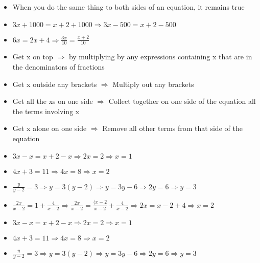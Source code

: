 \begin{frame}
\begin{itemize}
\item When you do the same thing to both sides of an equation, it remains true
\item $3x + 1000 = x + 2 + 1000 \Rightarrow 3x - 500  =  x + 2 - 500$
\vspace*{.35cm}
\item $6x = 2x  + 4 \Rightarrow \frac{3x}{10}  =  \frac{x+2}{10}$
\end{itemize}
\end{frame}
\begin{frame}
\begin{itemize}
\item Get x on top $\Rightarrow$ by multiplying by any expressions containing x that are in the denominators of fractions
\item Get x outside any brackets $\Rightarrow$ Multiply out any brackets
\item Get all the xs on one side $\Rightarrow$ Collect together on one side of the equation all the terms involving x
\item Get x alone on one side $\Rightarrow$ Remove all other terms from that side of the equation
\end{itemize}
\end{frame}
\begin{frame}
\begin{itemize}
\item $3x - x = x + 2 - x \Rightarrow 2x = 2  \Rightarrow x = 1$
\item $4x + 3 = 11 \Rightarrow 4x = 8    \Rightarrow  x = 2$
\item $ \frac{y}{y-2} = 3 \Rightarrow y = 3(y-2) \Rightarrow  y = 3y - 6 \Rightarrow 2y = 6 \Rightarrow y = 3$
\item $\frac{2x}{x-2} = 1 + \frac{4}{x-2} \Rightarrow \frac{2x}{x-2} =  \frac{(x-2}{x-2} + \frac{4}{x-2} \Rightarrow 2x  =  x-2 + 4 \Rightarrow  x = 2$
\end{itemize}
\end{frame}
\begin{frame}
\begin{itemize}
\item $3x - x = x + 2 - x \Rightarrow 2x = 2  \Rightarrow x = 1$
\item $4x + 3 = 11 \Rightarrow 4x = 8    \Rightarrow  x = 2$
\item $ \frac{y}{y-2} = 3 \Rightarrow y = 3(y-2) \Rightarrow  y = 3y - 6 \Rightarrow 2y = 6 \Rightarrow y = 3$
\end{itemize}
\end{frame}

